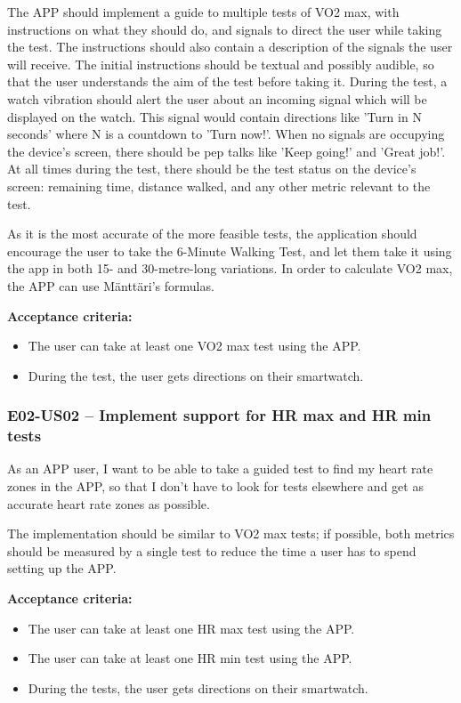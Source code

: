 The APP should implement a guide to multiple tests of VO2 max, with instructions on what they should do, and signals to direct the user while taking the test.
The instructions should also contain a description of the signals the user will receive.
The initial instructions should be textual and possibly audible, so that the user understands the aim of the test before taking it.
During the test, a watch vibration should alert the user about an incoming signal which will be displayed on the watch.
This signal would contain directions like 'Turn in N seconds' where N is a countdown to 'Turn now!'.
When no signals are occupying the device's screen, there should be pep talks like 'Keep going!' and 'Great job!'.
At all times during the test, there should be the test status on the device's screen: remaining time, distance walked, and any other metric relevant to the test.

As it is the most accurate of the more feasible tests, the application should encourage the user to take the 6-Minute Walking Test, and let them take it using the app in both 15- and 30-metre-long variations.
In order to calculate VO2 max, the APP can use Mänttäri's formulas.

\textbf{Acceptance criteria:}
\begin{itemize}
    \item The user can take at least one VO2 max test using the APP.
    \item During the test, the user gets directions on their smartwatch.
\end{itemize}

\subsubsection*{E02-US02 -- Implement support for HR max and HR min tests}
As an APP user, I want to be able to take a guided test to find my heart rate zones in the APP, so that I don't have to look for tests elsewhere and get as accurate heart rate zones as possible.

The implementation should be similar to VO2 max tests; if possible, both metrics should be measured by a single test to reduce the time a user has to spend setting up the APP.

\textbf{Acceptance criteria:}
\begin{itemize}
    \item The user can take at least one HR max test using the APP.
    \item The user can take at least one HR min test using the APP.
    \item During the tests, the user gets directions on their smartwatch.
\end{itemize}

